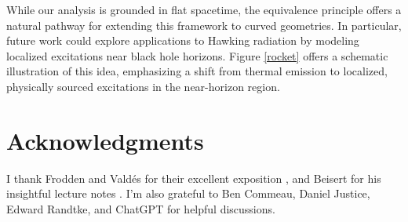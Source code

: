 \documentclass[12pt,a4paper]{article}
\begin{document}
While our analysis is grounded in flat spacetime, the equivalence principle offers a natural pathway for extending this framework to curved geometries. In particular, future work could explore applications to Hawking radiation by modeling localized excitations near black hole horizons. Figure \ref{rocket} offers a schematic illustration of this idea, emphasizing a shift from thermal emission to localized, physically sourced excitations in the near-horizon region.

\section{Acknowledgments}
I thank Frodden and Valdés for their excellent exposition \cite{frodden2018unruh}, and Beisert for his insightful lecture notes \cite{beisert2012quantum}. I'm also grateful to Ben Commeau, Daniel Justice, Edward Randtke, and ChatGPT for helpful discussions.




\end{document}
